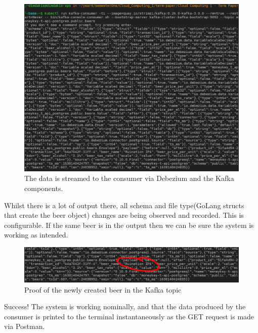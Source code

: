 \begin{flushleft}
    \begin{figure} [ht]
        \begin{center}
            \includegraphics[width=1\textwidth]{figures/data-from-kafka-consumer.png}
            \caption{The data is streamed to the consumer via Debezium and the Kafka components.}
            \label{fig: 2.18}
        \end{center}
    \end{figure}
    Whilst there is a lot of output there, all schema and file type(GoLang structs that create the beer object) changes are being observed and recorded. This is configurable.
    If the same beer is in the output then we can be sure the system is working as intended. \newline

    \begin{figure} [ht]
        \begin{center}
            \includegraphics[width=1\textwidth]{figures/ruinationIPA.png}
            \caption{Proof of the newly created beer in the Kafka  topic}
            \label{fig: 2.19}
        \end{center}
    \end{figure}
    \pagebreak
    Success! The system is working nominally, and that the data produced by the consumer is printed to the terminal instantaneously as the 
    GET request is made via Postman.

\end{flushleft}
